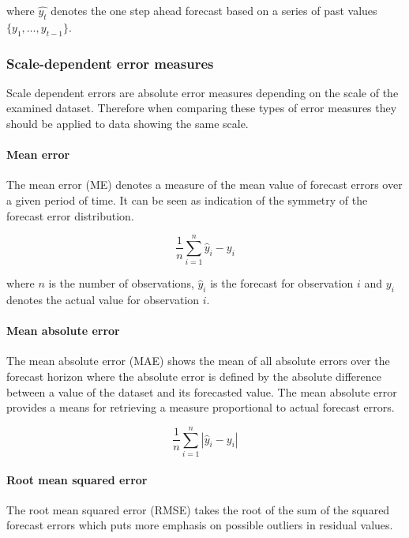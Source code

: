 where $\hat{y_t}$ denotes the one step ahead forecast based on a series of past values $\{y_1,\ldots,y_{t-1}\}$. 


\subsubsection{Scale-dependent error measures}

Scale dependent errors are absolute error measures depending on the scale of the examined dataset. Therefore when comparing these types of error measures they should be applied to data showing the same scale. 

\paragraph{Mean error}
The mean error (ME) denotes a measure of the mean value of forecast errors over a given period of time. 
It can be seen as indication of the symmetry of the forecast error distribution. 

\begin{equation}
\frac{1}{n} \sum_{i=1}^{n} \hat{y}_i - y_i
\label{eq:acc_me}
\end{equation}

where $n$ is the number of observations, $\hat{y}_i$ is the forecast for observation $i$ and $y_i$ denotes the actual value for observation $i$. 

\paragraph{Mean absolute error}
The mean absolute error (MAE) shows the mean of all absolute errors over the forecast horizon where the absolute error is defined by the absolute difference between a value of the dataset and its forecasted value. The mean absolute error provides a means for retrieving a measure proportional to actual forecast errors. 

\begin{equation}
\frac{1}{n} \sum_{i=1}^{n} |\hat{y}_i - y_i|
\label{eq:acc_mae}
\end{equation}



\paragraph{Root mean squared error}
The root mean squared error (RMSE) takes the root of the sum of the squared forecast errors which puts more emphasis on possible outliers in residual values. 

